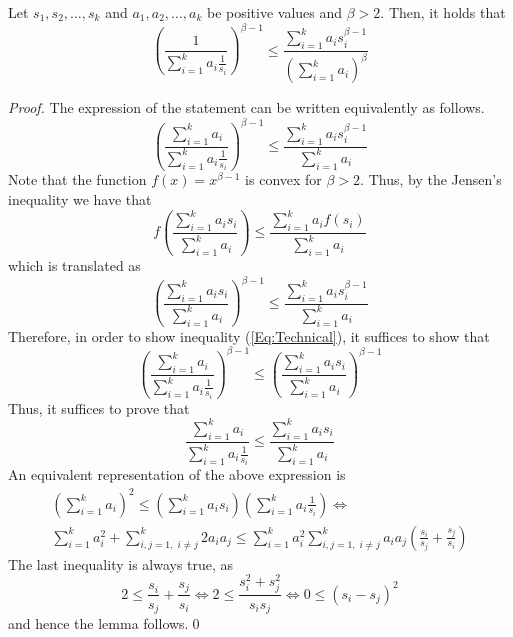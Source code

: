 \documentclass{llncs}
\begin{document}
\begin{lemma} \label{le:technical}
Let $s_1,s_2,\ldots,s_k$ and $a_1,a_2,\ldots,a_k$ be positive values and $\beta>2$.
Then, it holds that
\begin{equation*}
\left(\frac{1}{\sum_{i=1}^ka_i\frac{1}{s_i}}\right)^{\beta-1}\leq \frac{\sum_{i=1}^ka_is_i^{\beta-1}}{\left(\sum_{i=1}^ka_i\right)^{\beta}}
\end{equation*}
\end{lemma}
\begin{proof}
The expression of the statement can be written equivalently as follows.
\begin{equation}
\label{Eq:Technical}
\left(\frac{\sum_{i=1}^ka_i}{\sum_{i=1}^ka_i\frac{1}{s_i}}\right)^{\beta-1}\leq \frac{\sum_{i=1}^ka_is_i^{\beta-1}}{\sum_{i=1}^ka_i}
\end{equation}
Note that the function $f(x)=x^{\beta-1}$ is convex for $\beta>2$.
Thus, by the Jensen's inequality we have that
\begin{equation*}
f\left(\frac{\sum_{i=1}^ka_is_i}{\sum_{i=1}^ka_i}\right)\leq \frac{\sum_{i=1}^ka_if(s_i)}{\sum_{i=1}^ka_i}
\end{equation*}
which is translated as
\begin{equation*}
\left(\frac{\sum_{i=1}^ka_is_i}{\sum_{i=1}^ka_i}\right)^{\beta-1}\leq \frac{\sum_{i=1}^ka_is_i^{\beta-1}}{\sum_{i=1}^ka_i}
\end{equation*}
Therefore, in order to show inequality (\ref{Eq:Technical}), it suffices to show that
\begin{equation*}
\left(\frac{\sum_{i=1}^ka_i}{\sum_{i=1}^ka_i\frac{1}{s_i}}\right)^{\beta-1}\leq \left(\frac{\sum_{i=1}^ka_is_i}{\sum_{i=1}^ka_i}\right)^{\beta-1}
\end{equation*}
Thus, it suffices to prove that
\begin{equation*}
\frac{\sum_{i=1}^ka_i}{\sum_{i=1}^ka_i\frac{1}{s_i}}\leq \frac{\sum_{i=1}^ka_is_i}{\sum_{i=1}^ka_i}
\end{equation*}
An equivalent representation of the above expression is
\begin{eqnarray*}
\left(\sum_{i=1}^ka_i\right)^2\leq\left(\sum_{i=1}^ka_is_i\right) \left(\sum_{i=1}^ka_i\frac{1}{s_i}\right)\Leftrightarrow \\
\sum_{i=1}^ka_i^2+\sum_{i,j=1,\;i\neq j}^k2a_ia_j\leq \sum_{i=1}^ka_i^2 \sum_{i,j=1,\;i\neq j}^ka_ia_j\left(\frac{s_i}{s_j}+\frac{s_j}{s_i}\right)
\end{eqnarray*}
The last inequality is always true, as
\begin{equation*}
2\leq\frac{s_i}{s_j}+\frac{s_j}{s_i}\Leftrightarrow2\leq\frac{s_i^2+s_j^2}{s_is_j} \Leftrightarrow 0\leq(s_i-s_j)^2
\end{equation*}
and hence the lemma follows.\qed
\end{proof}
\end{document}

